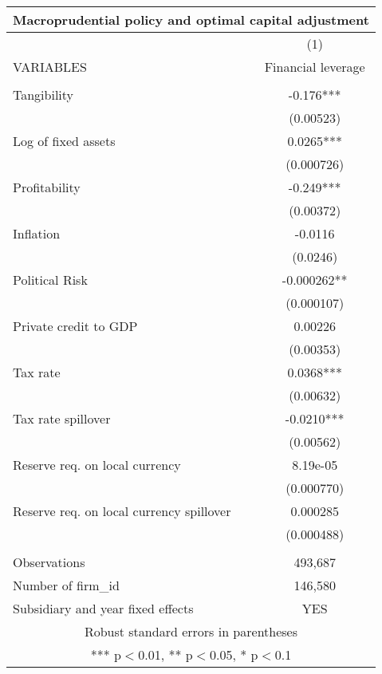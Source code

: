 \begin{tabular}{lc}
\multicolumn{2}{c}{Macroprudential policy and optimal capital adjustment} \\ \hline
 & (1) \\
VARIABLES & Financial leverage \\ \hline
 &  \\
Tangibility & -0.176*** \\
 & (0.00523) \\
Log of fixed assets & 0.0265*** \\
 & (0.000726) \\
Profitability & -0.249*** \\
 & (0.00372) \\
Inflation & -0.0116 \\
 & (0.0246) \\
Political Risk & -0.000262** \\
 & (0.000107) \\
Private credit to GDP & 0.00226 \\
 & (0.00353) \\
Tax rate & 0.0368*** \\
 & (0.00632) \\
Tax rate spillover & -0.0210*** \\
 & (0.00562) \\
Reserve req. on local currency & 8.19e-05 \\
 & (0.000770) \\
Reserve req. on local currency spillover & 0.000285 \\
 & (0.000488) \\
 &  \\
Observations & 493,687 \\
Number of firm\_id & 146,580 \\
 Subsidiary and year fixed effects & YES \\ \hline
\multicolumn{2}{c}{ Robust standard errors in parentheses} \\
\multicolumn{2}{c}{ *** p$<$0.01, ** p$<$0.05, * p$<$0.1} \\
\end{tabular}
